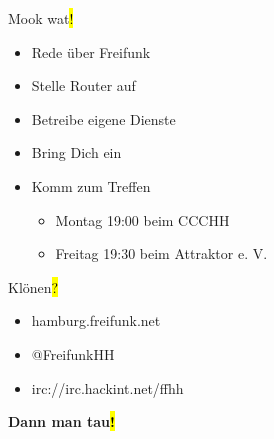 \documentclass[t]{beamer}
\begin{document}
\begin{frame}{Mook wat\hl{!}}
    \begin{itemize}
        \item Rede über Freifunk
        \item Stelle Router auf
        \item Betreibe eigene Dienste
        \item Bring Dich ein
        \item Komm zum Treffen
        \begin{itemize}
            \item Montag 19:00 beim CCCHH
            \item Freitag 19:30 beim Attraktor e. V.
        \end{itemize}
    \end{itemize}
\end{frame}

\begin{frame}{Klönen\hl{?}}
    \begin{itemize}
        \item hamburg.freifunk.net
        \item @FreifunkHH
        \item irc://irc.hackint.net/ffhh
    \end{itemize}
\end{frame}

\begin{frame}{}
    \vspace{1.6cm}
    \centering 
    \vspace{0.8cm}

    {\Huge\bf Dann man tau\hl{!}}
\end{frame}
\end{document}
